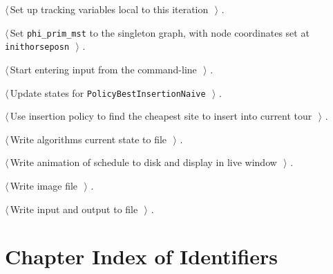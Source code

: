 \documentclass[11.5pt]{report}
\begin{document}
{\begin{list}{}{\setlength{\itemsep}{-\parsep}\setlength{\itemindent}{-\leftmargin}}
\item $\langle\,$Set up tracking variables local to this iteration\nobreak\ {\footnotesize {}}$\,\rangle$ {\footnotesize {\NWtxtRefIn} .}
\item $\langle\,$Set \verb|phi_prim_mst| to the singleton graph, with node coordinates set at \verb|inithorseposn|\nobreak\ {\footnotesize {}}$\,\rangle$ {\footnotesize {\NWtxtRefIn} .}
\item $\langle\,$Start entering input from the command-line\nobreak\ {\footnotesize {}}$\,\rangle$ {\footnotesize {\NWtxtRefIn} .}
\item $\langle\,$Update states for \texttt{PolicyBestInsertionNaive}\nobreak\ {\footnotesize {}}$\,\rangle$ {\footnotesize {\NWtxtRefIn} .}
\item $\langle\,$Use insertion policy to find the cheapest site to insert into current tour\nobreak\ {\footnotesize {}}$\,\rangle$ {\footnotesize {\NWtxtRefIn} .}
\item $\langle\,$Write algorithms current state to file\nobreak\ {\footnotesize {}}$\,\rangle$ {\footnotesize {\NWtxtRefIn} .}
\item $\langle\,$Write animation of schedule to disk and display in live window\nobreak\ {\footnotesize {}}$\,\rangle$ {\footnotesize {\NWtxtRefIn} .}
\item $\langle\,$Write image file\nobreak\ {\footnotesize {}}$\,\rangle$ {\footnotesize {\NWtxtRefIn} .}
\item $\langle\,$Write input and output to file\nobreak\ {\footnotesize {}}$\,\rangle$ {\footnotesize {\NWtxtRefIn} .}
\end{list}}
\section{Chapter Index of Identifiers}
\end{document}
